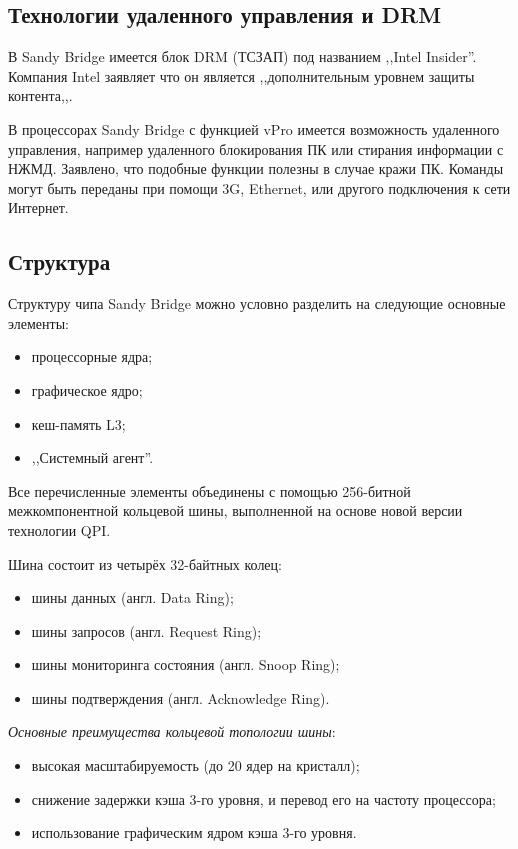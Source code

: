 \documentclass[a4paper,12pt,notitlepage,headsepline,pdftex]{scrartcl}
\begin{document}
\subsection{Технологии удаленного управления и DRM}
  В Sandy Bridge имеется блок DRM (ТСЗАП) под названием ,,Intel Insider''.
  Компания Intel заявляет что он является ,,дополнительным уровнем защиты
  контента,,.

  В процессорах Sandy Bridge с функцией vPro имеется возможность удаленного
  управления, например удаленного блокирования ПК или стирания информации с
  НЖМД.
  Заявлено, что подобные функции полезны в случае кражи ПК.
  Команды могут быть переданы при помощи 3G, Ethernet, или другого подключения
  к сети Интернет.

\subsection{Структура}
  Структуру чипа Sandy Bridge можно условно разделить на следующие основные
  элементы:
  \begin{itemize}
    \item процессорные ядра;
    \item графическое ядро;
    \item кеш-память L3;
    \item ,,Системный агент''.
  \end{itemize}

  Все перечисленные элементы объединены с помощью 256-битной межкомпонентной
  кольцевой шины, выполненной на основе новой версии технологии QPI.

  Шина состоит из четырёх 32-байтных колец:
  \begin{itemize}
    \item шины данных (англ. Data Ring);
    \item шины запросов (англ. Request Ring);
    \item шины мониторинга состояния (англ. Snoop Ring);
    \item шины подтверждения (англ. Acknowledge Ring).
  \end{itemize}

  \emph{Основные преимущества кольцевой топологии шины}:
  \begin{itemize}
    \item высокая масштабируемость (до 20 ядер на кристалл);
    \item снижение задержки кэша 3-го уровня, и перевод его на частоту
      процессора;
    \item использование графическим ядром кэша 3-го уровня.
  \end{itemize}
\end{document}
